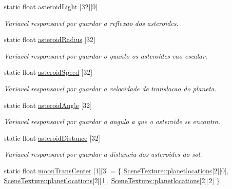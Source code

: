 \begin{DoxyCompactItemize}
static float \mbox{\hyperlink{class_scene_texture_ab4d8e8de2b4a9a8ee02af998cfe76a32}{asteroid\+Light}} \mbox{[}32\mbox{]}\mbox{[}9\mbox{]}
\begin{DoxyCompactList}\small\item\em Variavel responsavel por guardar a reflexao dos asteroides. \end{DoxyCompactList}\item 
static float \mbox{\hyperlink{class_scene_texture_ae5c021e52e6e1ae0ba014198fc698513}{asteroid\+Radius}} \mbox{[}32\mbox{]}
\begin{DoxyCompactList}\small\item\em Variavel responsavel por guardar o quanto os asteroides vao escalar. \end{DoxyCompactList}\item 
static float \mbox{\hyperlink{class_scene_texture_a559dd4e0ca7372066b1722e4628b0ba9}{asteroid\+Speed}} \mbox{[}32\mbox{]}
\begin{DoxyCompactList}\small\item\em Variavel responsavel por guardar a velocidade de translacao do planeta. \end{DoxyCompactList}\item 
static float \mbox{\hyperlink{class_scene_texture_ab58cb404a41dfafb30669b9e8370aa3c}{asteroid\+Angle}} \mbox{[}32\mbox{]}
\begin{DoxyCompactList}\small\item\em Variavel responsavel por guardar o angulo a que o asteroide se encontra. \end{DoxyCompactList}\item 
static float \mbox{\hyperlink{class_scene_texture_ae26e5fac3105908842e7bd0fa351115f}{asteroid\+Distance}} \mbox{[}32\mbox{]}
\begin{DoxyCompactList}\small\item\em Variavel responsavel por guardar a distancia dos asteroides ao sol. \end{DoxyCompactList}\item 
static float \mbox{\hyperlink{class_scene_texture_a116f1f15f385d94dee75092b2feaa20c}{moon\+Trans\+Center}} \mbox{[}1\mbox{]}\mbox{[}3\mbox{]} = \{ \mbox{\hyperlink{class_scene_texture_a1492e81fe8f97df9c6798e46ab09cb28}{Scene\+Texture\+::planetlocations}}\mbox{[}2\mbox{]}\mbox{[}0\mbox{]}, \mbox{\hyperlink{class_scene_texture_a1492e81fe8f97df9c6798e46ab09cb28}{Scene\+Texture\+::planetlocations}}\mbox{[}2\mbox{]}\mbox{[}1\mbox{]}, \mbox{\hyperlink{class_scene_texture_a1492e81fe8f97df9c6798e46ab09cb28}{Scene\+Texture\+::planetlocations}}\mbox{[}2\mbox{]}\mbox{[}2\mbox{]} \}

\end{DoxyCompactItemize}
